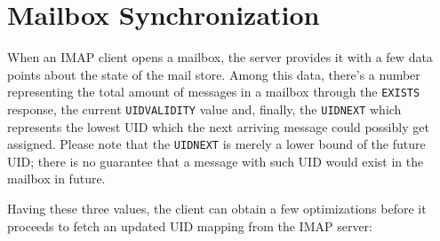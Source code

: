 \documentclass[trojita]{subfiles}
\begin{document}
\section{Mailbox Synchronization}
\label{sec:imap-mailbox-sync}

When an IMAP client opens a mailbox, the server provides it with a few data points about the state of the mail store.
Among this data, there's a number representing the total amount of messages in a mailbox through the {\tt EXISTS}
response, the current {\tt UIDVALIDITY} value and, finally, the {\tt UIDNEXT} which represents the lowest UID which the
next arriving message could possibly get assigned.  Please note that the {\tt UIDNEXT} is merely a lower bound of the
future UID; there is no guarantee that a message with such UID would exist in the mailbox in future.

Having these three values, the client can obtain a few optimizations before it proceeds to fetch an updated UID mapping
from the IMAP server:
\end{document}
